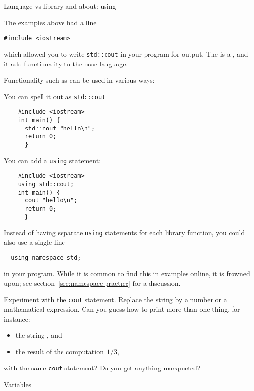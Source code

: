  {Language vs library and about: using}
\label{sec:usingio}

The examples above had a line
\begin{lstlisting}
#include <iostream>
\end{lstlisting}
which allowed you to write \lstinline{std::cout} in your program
for output.
The  is a ,
and it add 
functionality to the base language.

Functionality such as  can be used in various ways:
\begin{multicols}{2}
  You can spell it out as \lstinline+std::cout+:
  \begin{lstlisting}
    #include <iostream>
    int main() {
      std::cout "hello\n";
      return 0;
      }
  \end{lstlisting}
  \columnbreak
  You can add a \lstinline{using} statement:
  \begin{lstlisting}
    #include <iostream>
    using std::cout;
    int main() {
      cout "hello\n";
      return 0;
      }
  \end{lstlisting}
\end{multicols}

Instead of having separate \lstinline{using} statements
for each library function,
you could also use a single line
\begin{lstlisting}
  using namespace std;
\end{lstlisting}
in your program.
While it is common to find this in examples online, it is frowned upon;
see section~\ref{sec:namespace-practice} for a discussion.

\begin{exercise}
  \label{ex:cout-what}
  Experiment with the \lstinline{cout} statement. Replace the string by a
  number or a mathematical expression. Can you guess how to print more
  than one thing, for instance:
  \begin{itemize}
  \item the string , and
  \item the result of the computation~$1/3$,     
  \end{itemize}
  with the same \lstinline{cout} statement?
  Do you get anything unexpected?
\end{exercise}

 {Variables}
\label{sec:variables}


